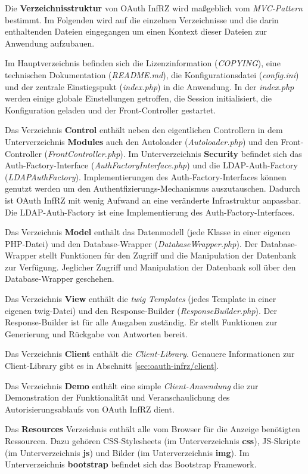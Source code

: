 \documentclass[12pt,a4paper,pointednumbers,abstracton]{scrartcl}
\begin{document}
Die \textbf{Verzeichnisstruktur} von OAuth InfRZ wird maßgeblich vom \emph{MVC-Pattern} bestimmt.
Im Folgenden wird auf die einzelnen Verzeichnisse und die darin enthaltenden Dateien eingegangen um einen Kontext dieser Dateien zur Anwendung aufzubauen.

Im Hauptverzeichnis befinden sich die Lizenzinformation (\emph{COPYING}), eine technischen Dokumentation (\emph{README.md}), die Konfigurationsdatei (\emph{config.ini}) und der zentrale Einstiegspukt (\emph{index.php}) in die Anwendung.
In der \emph{index.php} werden einige globale Einstellungen getroffen, die Session initialisiert, die Konfiguration geladen und der Front-Controller gestartet.

Das Verzeichnis \textbf{Control} enthält neben den eigentlichen Controllern in dem Unterverzeichnis \textbf{Modules} auch den Autoloader (\emph{Autoloader.php}) und den Front-Controller (\emph{FrontController.php}).
Im Unterverzeichnis \textbf{Security} befindet sich das Auth-Factory-Interface (\emph{AuthFactoryInterface.php}) und die LDAP-Auth-Factory (\emph{LDAPAuthFactory}).
Implementierungen des Auth-Factory-Interfaces können genutzt werden um den Authentfizierungs-Mechanismus auszutauschen.
Dadurch ist OAuth InfRZ mit wenig Aufwand an eine veränderte Infrastruktur anpassbar.
Die LDAP-Auth-Factory ist eine Implementierung des Auth-Factory-Interfaces.

Das Verzeichnis \textbf{Model} enthält das Datenmodell (jede Klasse in einer eigenen PHP-Datei) und den Database-Wrapper (\emph{DatabaseWrapper.php}).
Der Database-Wrapper stellt Funktionen für den Zugriff und die Manipulation der Datenbank zur Verfügung.
Jeglicher Zugriff und Manipulation der Datenbank soll über den Database-Wrapper geschehen.

Das Verzeichnis \textbf{View} enthält die \emph{twig Templates} (jedes Template in einer eigenen twig-Datei) und den Response-Builder (\emph{ResponseBuilder.php}).
Der Response-Builder ist für alle Ausgaben zuständig.
Er stellt Funktionen zur Generierung und Rückgabe von Antworten bereit.

Das Verzeichnis \textbf{Client} enthält die \emph{Client-Library}. Genauere Informationen zur Client-Library gibt es in Abschnitt \ref{sec:oauth-infrz/client}.

Das Verzeichnis \textbf{Demo} enthält eine simple \emph{Client-Anwendung} die zur Demonstration der Funktionalität und Veranschaulichung des Autorisierungsablaufs von OAuth InfRZ dient.

Das \textbf{Resources} Verzeichnis enthält alle vom Browser für die Anzeige benötigten Ressourcen. Dazu gehören CSS-Stylesheets (im Unterverzeichnis \textbf{css}), JS-Skripte (im Unterverzeichnis \textbf{js}) und Bilder (im Unterverzeichnis \textbf{img}). Im Unterverzeichnis \textbf{bootstrap} befindet sich das Bootstrap Framework.
\end{document}
